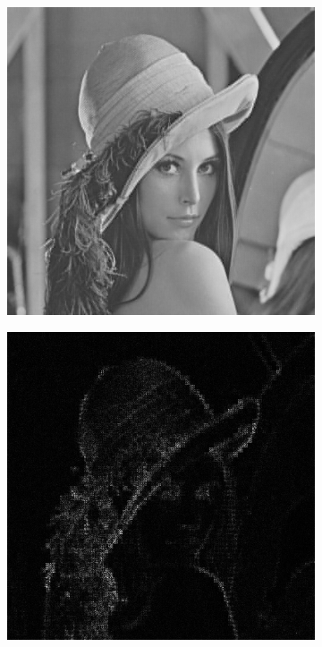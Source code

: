 \begin{figure}[h!]
\begin{subfigure}[b]{0.3\linewidth}
		\caption{}
		\label{fig:lenna}
	\end{subfigure}
	\begin{subfigure}[b]{0.3\linewidth}
		\includegraphics[width=\linewidth]{myfigure/p7/7_threshold_median.png}
		\caption{}
		\label{fig:7threshold}
	\end{subfigure}
	\begin{subfigure}[b]{0.3\linewidth}
		\includegraphics[width=\linewidth]{myfigure/p7/7_threshold_median_diff.png}
		\caption{}
		\label{fig:7thresholddiff}
	\end{subfigure}
	

\end{figure}
